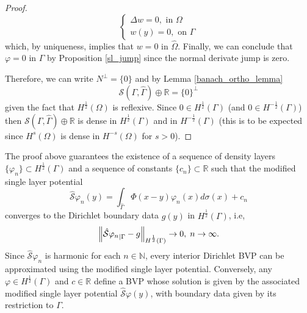 \begin{proof}
    \[
        \begin{cases}
            \Delta w = 0, \text{ in } \Omega\\
            w(y) = 0, \text{ on } \Gamma
        \end{cases}
    \]
    which, by uniqueness, implies that \(w = 0\) in \(\hat{\Omega}\). Finally, we can conclude that \(\varphi = 0\) in \(\Gamma\) by Proposition \ref{sl_jump} since the normal derivate jump is zero.

    Therefore, we can write \(N^\perp = \{0\}\) and by Lemma \ref{banach_ortho_lemma}
    \[
        \mathcal{S}(\Gamma, \hat{\Gamma}) \oplus \mathbb{R} = \{0\}^\perp
    \]
    given the fact that \(H^\frac{1}{2}(\Omega)\) is reflexive. Since \(0 \in H^\frac{1}{2}(\Gamma)\) (and \(0 \in H^{-\frac{1}{2}}(\Gamma)\)) then \(\mathcal{S}(\Gamma, \hat{\Gamma}) \oplus \mathbb{R}\) is dense in \(H^\frac{1}{2}(\Gamma)\) and in \(H^{-\frac{1}{2}}(\Gamma)\) (this is to be expected since \(H^{s}(\Omega)\) is dense in \(H^{-s}(\Omega)\) for \(s > 0\)).
\end{proof}
\begin{remark}\label{remark_density_sequence_density_layers}
    The proof above guarantees the existence of a sequence of density layers \(\{\varphi_n\} \subset H^{\frac{1}{2}}(\Gamma)\) and a sequence of constants \(\{c_n\} \subset \mathbb{R}\) such that the modified single layer potential
    \[
        \hat{\mathcal{S}}\varphi_n(y) = \int_{\hat{\Gamma}} \Phi(x-y)\varphi_n(x) d\sigma(x) + c_n
    \]
    converges to the Dirichlet boundary data \(g(y)\) in \(H^\frac{1}{2}(\Gamma)\), i.e,
    \[
        \norm{{\hat{\mathcal{S}}\varphi_n}_{|\Gamma} - g}_{H^\frac{1}{2}(\Gamma)} \rightarrow 0, \; n \rightarrow \infty.
    \]
    Since \(\hat{\mathcal{S}}\varphi_n\) is harmonic for each \(n \in \mathbb{N}\), every interior Dirichlet \ac{BVP} can be approximated using the modified single layer potential. Conversely, any \(\varphi \in H^\frac{1}{2}(\Gamma)\) and \(c \in \mathbb{R}\) define a \ac{BVP} whose solution is given by the associated modified single layer potential \(\hat{\mathcal{S}}\varphi(y)\), with boundary data given by its restriction to \(\Gamma\).
\end{remark}

